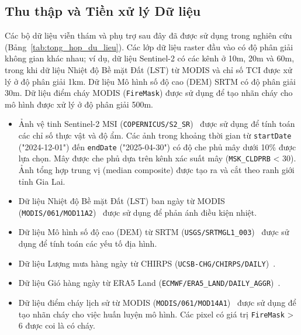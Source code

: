 \documentclass{article}
\begin{document}
\subsection{Thu thập và Tiền xử lý Dữ liệu} %
Các bộ dữ liệu viễn thám và phụ trợ sau đây đã được sử dụng trong nghiên cứu (Bảng~\ref{tab:tong_hop_du_lieu}). Các lớp dữ liệu raster đầu vào có độ phân giải không gian khác nhau; ví dụ, dữ liệu Sentinel-2 có các kênh ở 10m, 20m và 60m, trong khi dữ liệu Nhiệt độ Bề mặt Đất (LST) từ MODIS và chỉ số TCI được xử lý ở độ phân giải 1km. Dữ liệu Mô hình số độ cao (DEM) SRTM có độ phân giải 30m. Dữ liệu điểm cháy MODIS (\texttt{FireMask}) được sử dụng để tạo nhãn cháy cho mô hình được xử lý ở độ phân giải 500m.
\begin{itemize} %
    \item Ảnh vệ tinh Sentinel-2 MSI (\texttt{COPERNICUS/S2\_SR})~\cite{Drusch2012} được sử dụng để tính toán các chỉ số thực vật và độ ẩm. Các ảnh trong khoảng thời gian từ \texttt{startDate} ("2024-12-01") đến \texttt{endDate} ("2025-04-30") có độ che phủ mây dưới 10\% được lựa chọn. Mây được che phủ dựa trên kênh xác suất mây (\texttt{MSK\_CLDPRB} < 30). Ảnh tổng hợp trung vị (median composite) được tạo ra và cắt theo ranh giới tỉnh Gia Lai.
    \item Dữ liệu Nhiệt độ Bề mặt Đất (LST) ban ngày từ MODIS (\texttt{MODIS/061/MOD11A2})~\cite{Wan2014} được sử dụng để phản ánh điều kiện nhiệt.
    \item Dữ liệu Mô hình số độ cao (DEM) từ SRTM (\texttt{USGS/SRTMGL1\_003})~\cite{Farr2007} được sử dụng để tính toán các yếu tố địa hình.
    \item Dữ liệu Lượng mưa hàng ngày từ CHIRPS (\texttt{UCSB-CHG/CHIRPS/DAILY})~\cite{Funk2015}.
    \item Dữ liệu Gió hàng ngày từ ERA5 Land (\texttt{ECMWF/ERA5\_LAND/DAILY\_AGGR})~\cite{MunozSabater2021}.
    \item Dữ liệu điểm cháy lịch sử từ MODIS (\texttt{MODIS/061/MOD14A1})~\cite{Justice2002} được sử dụng để tạo nhãn cháy cho việc huấn luyện mô hình. Các pixel có giá trị \texttt{FireMask} > 6 được coi là có cháy.
\end{itemize}
\end{document}
